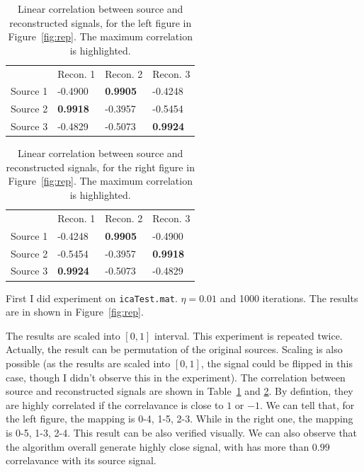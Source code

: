 \documentclass[10pt]{article}
\begin{document}
\begin{table}[h]
\centering
\begin{tabular}{ | l l l l | }
\hline
& Recon. 1& Recon. 2& Recon. 3\\
Source 1&-0.4900& \textbf{0.9905}& -0.4248\\
Source 2&\textbf{0.9918}& -0.3957& -0.5454\\
Source 3&-0.4829& -0.5073& \textbf{0.9924}\\
\hline
\end{tabular}
\caption{Linear correlation between source and reconstructed signals, for
the left figure in Figure~\ref{fig:rep}. The maximum correlation is
highlighted.}
\label{tbl:corr1}
\end{table}

\begin{table}[h]
\centering
\begin{tabular}{ | l l l l | }
\hline
& Recon. 1& Recon. 2& Recon. 3\\
Source 1&-0.4248& \textbf{0.9905}&-0.4900\\
Source 2&-0.5454&-0.3957& \textbf{0.9918}\\
Source 3&\textbf{0.9924}&-0.5073&-0.4829\\
\hline
\end{tabular}
\caption{Linear correlation between source and reconstructed signals, for
the right figure in Figure~\ref{fig:rep}. The maximum correlation is
highlighted.}
\label{tbl:corr2}
\end{table}

First I did experiment on \texttt{icaTest.mat}. $\eta = 0.01$ and 1000
iterations. The results are in shown in Figure~\ref{fig:rep}. 

The results are scaled into $[0, 1]$ interval. This experiment is repeated
twice. Actually, the result can be permutation of the original sources.
Scaling is also possible (as the results are scaled into $[0, 1]$, the
signal could be flipped in this case, though I didn't observe this in the
experiment). The correlation between source and reconstructed signals are
shown in Table~\ref{tbl:corr1} and \ref{tbl:corr2}. By defintion, they are
highly correlated if the correlavance is close to $1$ or $-1$. We can tell
that, for the left figure, the mapping is 0-4, 1-5, 2-3. While in the right
one, the mapping is 0-5, 1-3, 2-4. This result can be also verified visually. We
can also observe that the algorithm overall generate highly close signal,
with has more than $0.99$ correlavance with its source signal.
\end{document}
